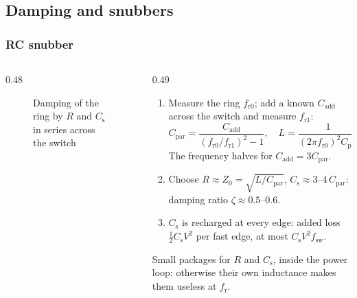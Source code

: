 \subsection{Damping and snubbers}

\begin{frame}
	\frametitle{RC snubber}
	\begin{columns}[T]
		\begin{column}{0.48\textwidth}
			\begin{figure}
				\centering
				\caption{Damping of the ring by $R$ and $C_\mathrm{s}$ in series across the switch}
			\end{figure}
		\end{column}
		\begin{column}{0.49\textwidth}
			\small
			\begin{enumerate}
				\item Measure the ring $f_\mathrm{r0}$; add a known $C_\mathrm{add}$ across the switch and measure $f_\mathrm{r1}$:
				      \begin{equation*}
					      C_\mathrm{par}=\frac{C_\mathrm{add}}{(f_\mathrm{r0}/f_\mathrm{r1})^2-1},\quad L=\frac{1}{(2\pi f_\mathrm{r0})^2C_\mathrm{par}}
				      \end{equation*}
				      The frequency halves for $C_\mathrm{add}=3C_\mathrm{par}$.
				\item Choose $R\approx Z_0=\sqrt{L/C_\mathrm{par}}$, $C_\mathrm{s}\approx3$--$4\,C_\mathrm{par}$: damping ratio $\zeta\approx0.5$--0.6.
				\item $C_\mathrm{s}$ is recharged at every edge: added loss $\frac12C_\mathrm{s}V^2$ per fast edge, at most $C_\mathrm{s}V^2f_\mathrm{sw}$.
			\end{enumerate}
			Small packages for $R$ and $C_\mathrm{s}$, inside the power loop: otherwise their own inductance makes them useless at $f_\mathrm{r}$.
		\end{column}
	\end{columns}
\end{frame}

